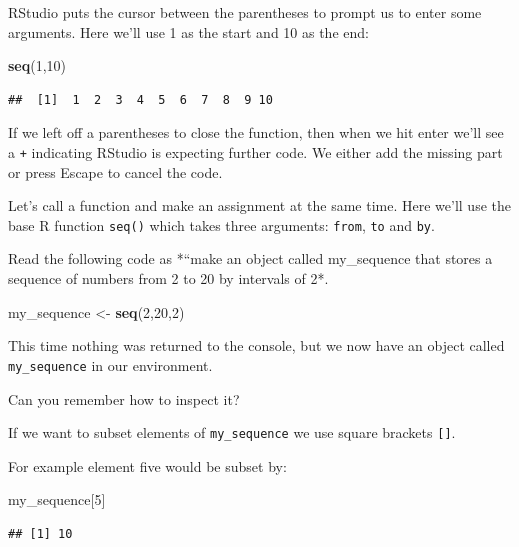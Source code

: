 \documentclass[12pt,]{book}
\newenvironment{Shaded}{\begin{snugshade}}{\end{snugshade}}
\newcommand{\KeywordTok}[1]{\textcolor[rgb]{0.13,0.29,0.53}{\textbf{#1}}}
\newcommand{\DecValTok}[1]{\textcolor[rgb]{0.00,0.00,0.81}{#1}}
\newcommand{\StringTok}[1]{\textcolor[rgb]{0.31,0.60,0.02}{#1}}
\newcommand{\NormalTok}[1]{#1}
\theoremstyle{definition}
\theoremstyle{definition}
\theoremstyle{definition}
\theoremstyle{remark}
\begin{document}
RStudio puts the cursor between the parentheses to prompt us to enter
some arguments. Here we'll use 1 as the start and 10 as the end:

\begin{Shaded}
\begin{Highlighting}[]
\KeywordTok{seq}\NormalTok{(}\DecValTok{1}\NormalTok{,}\DecValTok{10}\NormalTok{)}
\end{Highlighting}
\end{Shaded}

\begin{verbatim}
##  [1]  1  2  3  4  5  6  7  8  9 10
\end{verbatim}

If we left off a parentheses to close the function, then when we hit
enter we'll see a \texttt{+} indicating RStudio is expecting further
code. We either add the missing part or press Escape to cancel the code.

Let's call a function and make an assignment at the same time. Here
we'll use the base R function \texttt{seq()} which takes three
arguments: \texttt{from}, \texttt{to} and \texttt{by}.

Read the following code as *``make an object called my\_sequence that
stores a sequence of numbers from 2 to 20 by intervals of 2*.

\begin{Shaded}
\begin{Highlighting}[]
\NormalTok{my_sequence <-}\StringTok{ }\KeywordTok{seq}\NormalTok{(}\DecValTok{2}\NormalTok{,}\DecValTok{20}\NormalTok{,}\DecValTok{2}\NormalTok{)}
\end{Highlighting}
\end{Shaded}

This time nothing was returned to the console, but we now have an object
called \texttt{my\_sequence} in our environment.

Can you remember how to inspect it?

If we want to subset elements of \texttt{my\_sequence} we use square
brackets \texttt{{[}{]}}.

For example element five would be subset by:

\begin{Shaded}
\begin{Highlighting}[]
\NormalTok{my_sequence[}\DecValTok{5}\NormalTok{]}
\end{Highlighting}
\end{Shaded}

\begin{verbatim}
## [1] 10
\end{verbatim}
\end{document}
